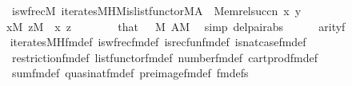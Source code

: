 \begin{isabellebody}
\ \ \ \ \ \ \ \ is{\isacharunderscore}{\kern0pt}wfrec{\isacharparenleft}{\kern0pt}{\isacharhash}{\kern0pt}{\isacharhash}{\kern0pt}M{\isacharcomma}{\kern0pt}\ iterates{\isacharunderscore}{\kern0pt}MH{\isacharparenleft}{\kern0pt}{\isacharhash}{\kern0pt}{\isacharhash}{\kern0pt}M{\isacharcomma}{\kern0pt}is{\isacharunderscore}{\kern0pt}list{\isacharunderscore}{\kern0pt}functor{\isacharparenleft}{\kern0pt}{\isacharhash}{\kern0pt}{\isacharhash}{\kern0pt}M{\isacharcomma}{\kern0pt}A{\isacharparenright}{\kern0pt}{\isacharcomma}{\kern0pt}{}{\isacharparenright}{\kern0pt}\ {\isacharcomma}{\kern0pt}\ Memrel{\isacharparenleft}{\kern0pt}succ{\isacharparenleft}{\kern0pt}n{\isacharparenright}{\kern0pt}{\isacharparenright}{\kern0pt}{\isacharcomma}{\kern0pt}\ x{\isacharcomma}{\kern0pt}\ y{\isacharparenright}{\kern0pt}{\isacharparenright}{\kern0pt}{\isachardoublequoteclose}\isanewline
\ \ \ \ \ \ \ {\isachardoublequoteopen}x{\isasymin}M{\isachardoublequoteclose}\ {\isachardoublequoteopen}z{\isasymin}M{\isachardoublequoteclose}\ \ x\ z\isanewline
\ \ \ \ \ \ \isamarkupfalse%
\ that\ {}\ {}\ {\isacartoucheopen}{}{\isasymin}M{\isacartoucheclose}\ {\isacartoucheopen}A{\isasymin}M{\isacartoucheclose}\ \isamarkupfalse%
\ {\isacharparenleft}{\kern0pt}simp\ del{\isacharcolon}{\kern0pt}pair{\isacharunderscore}{\kern0pt}abs{\isacharparenright}{\kern0pt}\isanewline
\ \ \ \ \isamarkupfalse%
\ {\isachardoublequoteopen}arity{\isacharparenleft}{\kern0pt}{\isacharquery}{\kern0pt}f{\isacharparenright}{\kern0pt}\ {\isacharequal}{\kern0pt}\ {}{\isachardoublequoteclose}\isanewline
\ \ \ \ \ \ \isamarkupfalse%
\ iterates{\isacharunderscore}{\kern0pt}MH{\isacharunderscore}{\kern0pt}fm{\isacharunderscore}{\kern0pt}def\ is{\isacharunderscore}{\kern0pt}wfrec{\isacharunderscore}{\kern0pt}fm{\isacharunderscore}{\kern0pt}def\ is{\isacharunderscore}{\kern0pt}recfun{\isacharunderscore}{\kern0pt}fm{\isacharunderscore}{\kern0pt}def\ is{\isacharunderscore}{\kern0pt}nat{\isacharunderscore}{\kern0pt}case{\isacharunderscore}{\kern0pt}fm{\isacharunderscore}{\kern0pt}def\isanewline
\ \ \ \ \ \ \ \ restriction{\isacharunderscore}{\kern0pt}fm{\isacharunderscore}{\kern0pt}def\ list{\isacharunderscore}{\kern0pt}functor{\isacharunderscore}{\kern0pt}fm{\isacharunderscore}{\kern0pt}def\ number{}{\isacharunderscore}{\kern0pt}fm{\isacharunderscore}{\kern0pt}def\ cartprod{\isacharunderscore}{\kern0pt}fm{\isacharunderscore}{\kern0pt}def\isanewline
\ \ \ \ \ \ \ \ sum{\isacharunderscore}{\kern0pt}fm{\isacharunderscore}{\kern0pt}def\ quasinat{\isacharunderscore}{\kern0pt}fm{\isacharunderscore}{\kern0pt}def\ pre{\isacharunderscore}{\kern0pt}image{\isacharunderscore}{\kern0pt}fm{\isacharunderscore}{\kern0pt}def\ fm{\isacharunderscore}{\kern0pt}defs\isanewline

\end{isabellebody}
